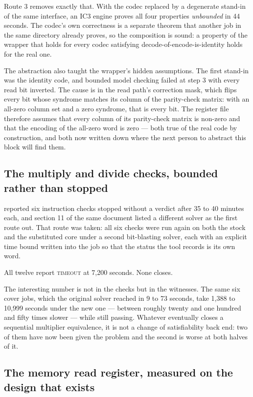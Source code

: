 Route 3 removes exactly that. With the codec replaced by a degenerate
stand-in of the same interface, an IC3 engine proves all four
properties \emph{unbounded} in 44 seconds. The codec's own correctness
is a separate theorem that another job in the same directory already
proves, so the composition is sound: a property of the wrapper that
holds for every codec satisfying decode-of-encode-is-identity holds for
the real one.

The abstraction also taught the wrapper's hidden assumptions. The first
stand-in was the identity code, and bounded model checking failed at
step 3 with every read bit inverted. The cause is in the read path's
correction mask, which flips every bit whose syndrome matches its
column of the parity-check matrix: with an all-zero column set and a
zero syndrome, that is every bit. The register file therefore assumes
that every column of its parity-check matrix is non-zero and that the
encoding of the all-zero word is zero --- both true of the real code by
construction, and both now written down where the next person to
abstract this block will find them.

\subsection{The multiply and divide checks, bounded rather than
stopped}
\label{sec:mext-result}

 reported six instruction checks stopped without
a verdict after 35 to 40 minutes each, and section 11 of the same
document listed a different solver as the first route out. That route
was taken: all six checks were run again on both the stock and the
substituted core under a second bit-blasting solver, each with an
explicit time bound written into the job so that the status the tool
records is its own word.

All twelve report \textsc{timeout} at 7{,}200 seconds. None closes.

The interesting number is not in the checks but in the witnesses. The
same six cover jobs, which the original solver reached in 9 to 73
seconds, take 1{,}388 to 10{,}999 seconds under the new one --- between
roughly twenty and one hundred and fifty times slower --- while still
passing. Whatever eventually closes a sequential multiplier
equivalence, it is not a change of satisfiability back end: two of them
have now been given the problem and the second is worse at both halves
of it.

\subsection{The memory read register, measured on the design that
exists}
\label{sec:rdreg-result}

